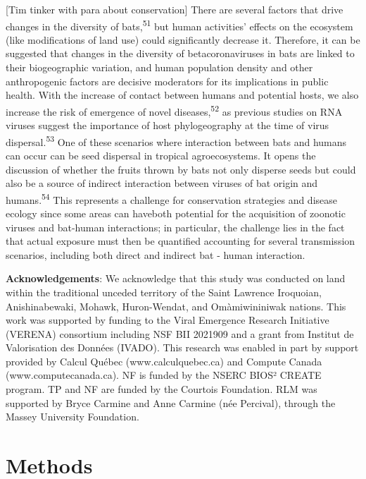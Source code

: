 \documentclass[10pt,oneside]{article}
\begin{document}
{[}Tim tinker with para about conservation{]} There are several factors
that drive changes in the diversity of bats,\textsuperscript{51} but
human activities' effects on the ecosystem (like modifications of land
use) could significantly decrease it. Therefore, it can be suggested
that changes in the diversity of betacoronaviruses in bats are linked to
their biogeographic variation, and human population density and other
anthropogenic factors are decisive moderators for its implications in
public health. With the increase of contact between humans and potential
hosts, we also increase the risk of emergence of novel
diseases,\textsuperscript{52} as previous studies on RNA viruses suggest
the importance of host phylogeography at the time of virus
dispersal.\textsuperscript{53} One of these scenarios where interaction
between bats and humans can occur can be seed dispersal in tropical
agroecosystems. It opens the discussion of whether the fruits thrown by
bats not only disperse seeds but could also be a source of indirect
interaction between viruses of bat origin and
humans.\textsuperscript{54} This represents a challenge for conservation
strategies and disease ecology since some areas can haveboth potential
for the acquisition of zoonotic viruses and bat-human interactions; in
particular, the challenge lies in the fact that actual exposure must
then be quantified accounting for several transmission scenarios,
including both direct and indirect bat - human interaction.

\textbf{Acknowledgements}: We acknowledge that this study was conducted
on land within the traditional unceded territory of the Saint Lawrence
Iroquoian, Anishinabewaki, Mohawk, Huron-Wendat, and Omàmiwininiwak
nations. This work was supported by funding to the Viral Emergence
Research Initiative (VERENA) consortium including NSF BII 2021909 and a
grant from Institut de Valorisation des Données (IVADO). This research
was enabled in part by support provided by Calcul Québec
(www.calculquebec.ca) and Compute Canada (www.computecanada.ca). NF is
funded by the NSERC BIOS² CREATE program. TP and NF are funded by the
Courtois Foundation. RLM was supported by Bryce Carmine and Anne Carmine
(née Percival), through the Massey University Foundation.

\newpage

\hypertarget{methods}{%
\section{Methods}\label{methods}}
\end{document}
